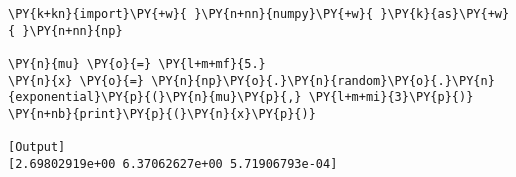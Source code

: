 \begin{Verbatim}[label=\makebox{\href{https://github.com/unipi-physics-labs/statnotes/tree/main/snippy/np.random.exponential.py}{https://github.com/.../np.random.exponential.py}},commandchars=\\\{\}]
\PY{k+kn}{import}\PY{+w}{ }\PY{n+nn}{numpy}\PY{+w}{ }\PY{k}{as}\PY{+w}{ }\PY{n+nn}{np}

\PY{n}{mu} \PY{o}{=} \PY{l+m+mf}{5.}
\PY{n}{x} \PY{o}{=} \PY{n}{np}\PY{o}{.}\PY{n}{random}\PY{o}{.}\PY{n}{exponential}\PY{p}{(}\PY{n}{mu}\PY{p}{,} \PY{l+m+mi}{3}\PY{p}{)}
\PY{n+nb}{print}\PY{p}{(}\PY{n}{x}\PY{p}{)}

[Output]
[2.69802919e+00 6.37062627e+00 5.71906793e-04]
\end{Verbatim}
